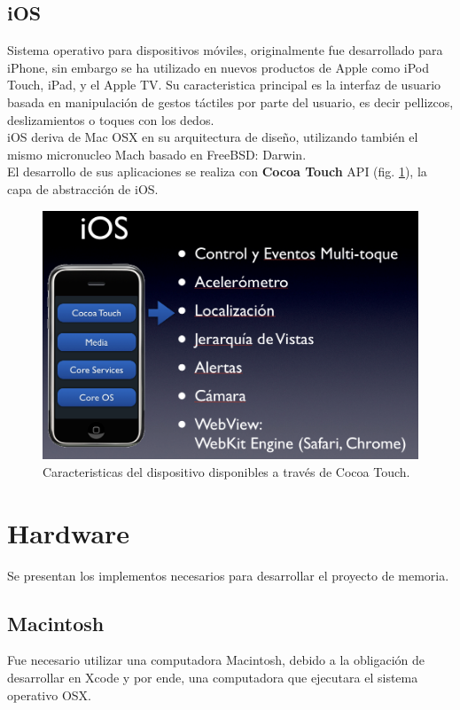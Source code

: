		\subsection{iOS}
Sistema operativo para dispositivos móviles, originalmente fue desarrollado para iPhone, sin embargo se ha utilizado en nuevos productos de Apple como iPod Touch, iPad, y el Apple TV. Su caracteristica principal es la interfaz de usuario basada en manipulación de gestos táctiles por parte del usuario, es decir pellizcos, deslizamientos o toques con los dedos.\\

iOS deriva de Mac OSX en su arquitectura de diseño, utilizando también el mismo micronucleo Mach basado en FreeBSD: Darwin.\\

El desarrollo de sus aplicaciones se realiza con \textbf{Cocoa Touch} API (fig. \ref{fig:ios-cocoatouch}), la capa de abstracción de iOS.
\begin{figure}[H]
	\centering
	\includegraphics[scale=0.35]{imgs/ios-cocoatouch.png} 
	\caption{Caracteristicas del dispositivo disponibles a través de Cocoa Touch.}
	\label{fig:ios-cocoatouch}
\end{figure}  


	\section{Hardware}
		Se presentan los implementos necesarios para desarrollar el proyecto de memoria.
		\subsection{Macintosh}
		Fue necesario utilizar una computadora Macintosh, debido a la obligación de desarrollar en Xcode y por ende, una computadora que ejecutara el sistema operativo OSX.\\
		
